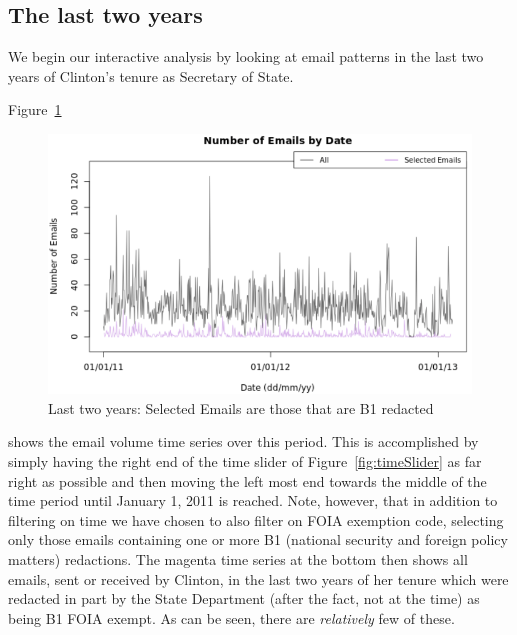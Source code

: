 \documentclass[journal]{vgtc}                %
\begin{document}
\subsection{The last two years}
We begin our interactive analysis by looking at  email patterns in the last two years of Clinton's tenure as Secretary of State.  

Figure~\ref{fig:lastTwoYears} 
\begin{figure}[h]
\begin{center}
\includegraphics[width=0.95\linewidth]{EmailVolumeB1LastTwoYears}
\caption{Last two years:  Selected Emails are those that are B1 redacted}
\label{fig:lastTwoYears}
\end{center}
\end{figure}
shows the email volume time series over this period. 
This is accomplished by simply having the right end of the time slider of Figure~\ref{fig:timeSlider} as far right as possible and then moving the left most end towards the middle of the time period until January 1, 2011 is reached.   Note, however, that in addition to filtering on time we have chosen to also filter on FOIA exemption code, selecting only those emails containing one or more B1 (national security and foreign policy matters) redactions.  The magenta time series at the bottom then shows all emails, sent or received by Clinton, in the last two years of her tenure which were redacted in part by the State Department (after the fact, not at the time) as being B1 FOIA exempt.  As can be seen, there are \emph{relatively} few of these.
\end{document}
